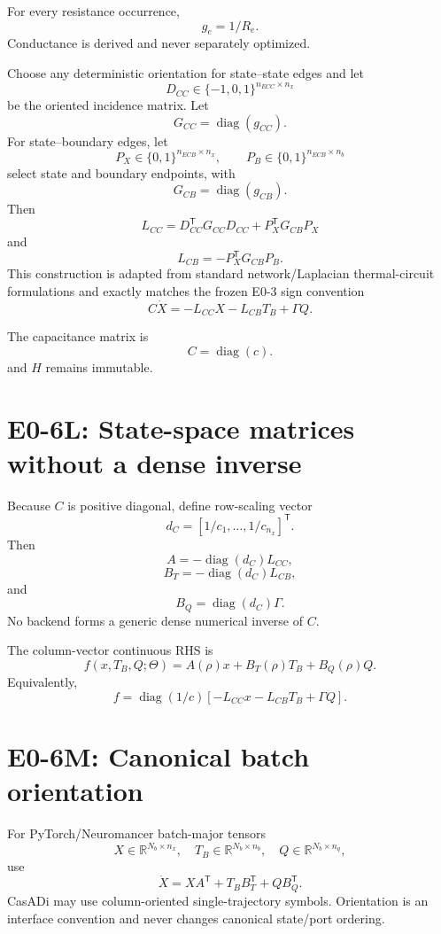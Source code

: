 \documentclass[11pt]{article}
\newcommand{\R}{\mathbb{R}}
\newcommand{\diagmat}{\operatorname{diag}}
\begin{document}
For every resistance occurrence,
\[
\boxed{g_e=1/R_e.}
\]
Conductance is derived and never separately optimized.

Choose any deterministic orientation for state--state edges and let
\[
D_{CC}\in\{-1,0,1\}^{n_{ECC}\times n_x}
\]
be the oriented incidence matrix. Let
\[
G_{CC}=\diagmat(g_{CC}).
\]
For state--boundary edges, let
\[
P_X\in\{0,1\}^{n_{ECB}\times n_x},\qquad
P_B\in\{0,1\}^{n_{ECB}\times n_b}
\]
select state and boundary endpoints, with
\[
G_{CB}=\diagmat(g_{CB}).
\]
Then
\[
\boxed{
L_{CC}=D_{CC}^{\mathsf T}G_{CC}D_{CC}
+P_X^{\mathsf T}G_{CB}P_X
}
\]
and
\[
\boxed{
L_{CB}=-P_X^{\mathsf T}G_{CB}P_B.
}
\]
This construction is adapted from standard network/Laplacian thermal-circuit
formulations \cite{GhiausAhmad2020ThermalCircuits} and exactly matches the frozen
E0-3 sign convention
\[
C\dot X=-L_{CC}X-L_{CB}T_B+\Gamma Q.
\]

The capacitance matrix is
\[
\boxed{C=\diagmat(c).}
\]
and $H$ remains immutable.

\section{E0-6L: State-space matrices without a dense inverse}

Because $C$ is positive diagonal, define row-scaling vector
\[
d_C=[1/c_1,\ldots,1/c_{n_x}]^{\mathsf T}.
\]
Then
\[
\boxed{A=-\diagmat(d_C)L_{CC}},
\]
\[
\boxed{B_T=-\diagmat(d_C)L_{CB}},
\]
and
\[
\boxed{B_Q=\diagmat(d_C)\Gamma.}
\]
No backend forms a generic dense numerical inverse of $C$.

The column-vector continuous RHS is
\[
\boxed{
f(x,T_B,Q;\Theta)=A(\rho)x+B_T(\rho)T_B+B_Q(\rho)Q.
}
\]
Equivalently,
\[
\boxed{
f=\diagmat(1/c)
\left[-L_{CC}x-L_{CB}T_B+\Gamma Q\right].
}
\]

\section{E0-6M: Canonical batch orientation}

For PyTorch/Neuromancer batch-major tensors
\[
X\in\R^{N_b\times n_x},\quad
T_B\in\R^{N_b\times n_b},\quad
Q\in\R^{N_b\times n_q},
\]
use
\[
\boxed{
\dot X=XA^{\mathsf T}+T_BB_T^{\mathsf T}+QB_Q^{\mathsf T}.
}
\]
CasADi may use column-oriented single-trajectory symbols. Orientation is an
interface convention and never changes canonical state/port ordering.
\end{document}
